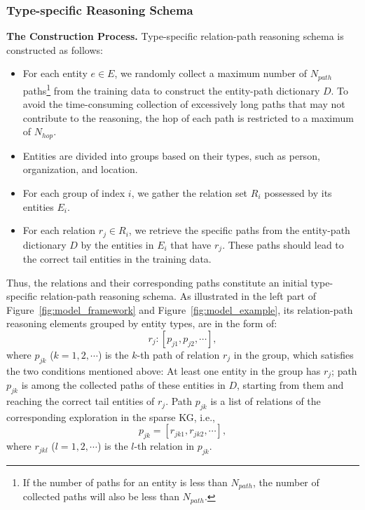 \documentclass[sigconf]{acmart}
\begin{document}
\subsubsection{Type-specific Reasoning Schema}
\textbf{The Construction Process.}
Type-specific relation-path reasoning schema is constructed as follows:
\begin{itemize}
	\item For each entity $e\in E$, we randomly collect a maximum number of $N_{path}$ paths\footnote{If the number of paths for an entity is less than $N_{path}$, the number of collected paths will also be less than $N_{path}$.} from the training data to construct the entity-path dictionary $D$. To avoid the time-consuming collection of excessively long paths that may not contribute to the reasoning, the hop of each path is restricted to a maximum of $N_{hop}$.
	\item Entities are divided into groups based on their types, such as person, organization, and location.
	\item For each group of index $i$, we gather the relation set $R_i$ possessed by its entities $E_i$.
	\item For each relation $r_j\in R_i$, we retrieve the specific paths from the entity-path dictionary $D$ by the entities in $E_i$ that have $r_j$. These paths should lead to the correct tail entities in the training data.~\label{item_condition}
\end{itemize}
Thus, the relations and their corresponding paths constitute an initial type-specific relation-path reasoning schema. As illustrated in the left part of Figure~\ref{fig:model_framework} and Figure~\ref{fig:model_example}, its relation-path reasoning elements grouped by entity types, are in the form of:
\begin{equation}
	r_j: [p_{j1}, p_{j2}, \cdots],
\end{equation}
where $p_{jk}$ ($k=1,2,\cdots$) is the $k$-th path of relation $r_j$ in the group, which satisfies the two conditions mentioned above: At least one entity in the group has $r_j$; path $p_{jk}$ is among the collected paths of these entities in $D$, starting from them and reaching the correct tail entities of $r_j$. Path $p_{jk}$ is a list of relations of the corresponding exploration in the sparse KG, i.e.,
\begin{equation}
	p_{jk} = [r_{jk1},r_{jk2},\cdots],
\end{equation}
where $r_{jkl}$ ($l=1,2,\cdots$) is the $l$-th relation in $p_{jk}$.
\end{document}
